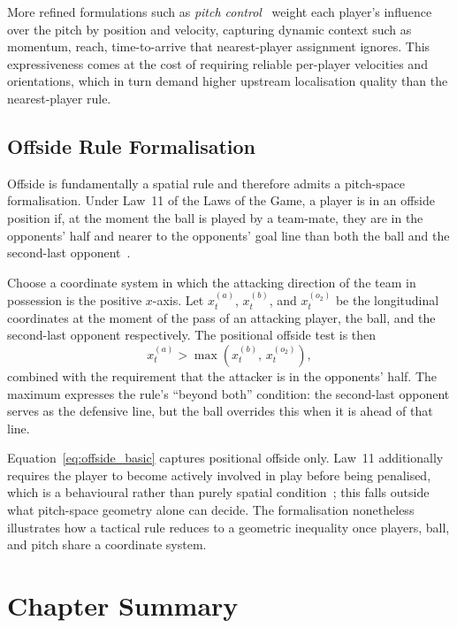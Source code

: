 More refined formulations such as \emph{pitch 
control}~\cite{fernandez2018wide} weight each player's 
influence over the pitch by position and velocity, capturing dynamic context such as momentum, reach, 
time-to-arrive that nearest-player assignment ignores. 
This expressiveness comes at the cost of requiring reliable 
per-player velocities and orientations, which in turn 
demand higher upstream localisation quality than the 
nearest-player rule.

\subsection{Offside Rule Formalisation}
\label{subsec:background_offside}

Offside is fundamentally a spatial rule and therefore 
admits a pitch-space formalisation. Under Law~11 of the 
Laws of the Game, a player is in an offside position if, 
at the moment the ball is played by a team-mate, they are 
in the opponents' half and nearer to the opponents' goal 
line than both the ball and the second-last 
opponent~\cite{IFAB2025}.

Choose a coordinate system in which the attacking 
direction of the team in possession is the positive 
\(x\)-axis. Let \(x_t^{(a)}\), \(x_t^{(b)}\), and 
\(x_t^{(o_2)}\) be the longitudinal coordinates at the 
moment of the pass of an attacking player, the ball, and 
the second-last opponent respectively. The positional 
offside test is then
\begin{equation}
    x_t^{(a)}
    > \max\!\left(x_t^{(b)},\, x_t^{(o_2)}\right),
    \label{eq:offside_basic}
\end{equation}
combined with the requirement that the attacker is in the 
opponents' half. The maximum expresses the rule's \enquote{beyond both} 
condition: the second-last opponent serves as the 
defensive line, but the ball overrides this when it is 
ahead of that line.

Equation~\ref{eq:offside_basic} captures positional 
offside only. Law~11 additionally requires the player to 
become actively involved in play before being penalised, 
which is a behavioural rather than purely spatial 
condition~\cite{IFAB2025}; this falls outside what 
pitch-space geometry alone can decide. The formalisation 
nonetheless illustrates how a tactical rule reduces to a 
geometric inequality once players, ball, and pitch share 
a coordinate system.

\section{Chapter Summary}
\label{sec:background_summary}

